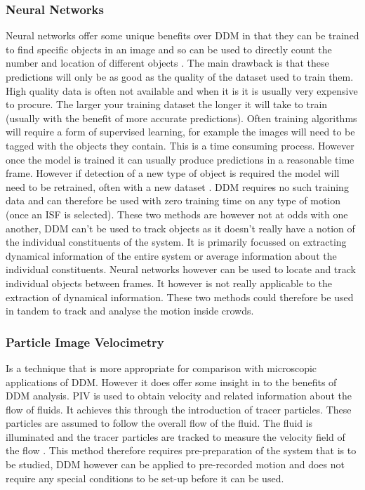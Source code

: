 \documentclass[10pt]{article}
\begin{document}
\subsubsection{Neural Networks}
Neural networks offer some unique benefits over DDM in that they can be trained to find specific objects in an image and so can be used to directly count the number and location of different objects \cite{yolov3}. The main drawback is that these predictions will only be as good as the quality of the dataset used to train them. High quality data is often not available and when it is it is usually very expensive to procure. The larger your training dataset the longer it will take to train (usually with the benefit of more accurate predictions). Often training algorithms will require a form of supervised learning, for example the images will need to be tagged with the objects they contain. This is a time consuming process. However once the model is trained it can usually produce predictions in a reasonable time frame. However if detection of a new type of object is required the model will need to be retrained, often with a new dataset \cite{tensorflow}. DDM requires no such training data and can therefore be used with zero training time on any type of motion (once an ISF is selected). These two methods are however not at odds with one another, DDM can't be used to track objects as it doesn't really have a notion of the individual constituents of the system. It is primarily focussed on extracting dynamical information of the entire system or average information about the individual constituents. Neural networks however can be used to locate and track individual objects between frames. It however is not really applicable to the extraction of dynamical information. These two methods could therefore be used in tandem to track and analyse the motion inside crowds.

\subsubsection{Particle Image Velocimetry}
Is a technique that is more appropriate for comparison with microscopic applications of DDM. However it does offer some insight in to the benefits of DDM analysis. PIV is used to obtain velocity and related information about the flow of fluids. It achieves this through the introduction of tracer particles. These particles are assumed to follow the overall flow of the fluid. The fluid is illuminated and the tracer particles are tracked to measure the velocity field of the flow \cite{piv}. This method therefore requires pre-preparation of the system that is to be studied, DDM however can be applied to pre-recorded motion and does not require any special conditions to be set-up before it can be used. 
\end{document}
